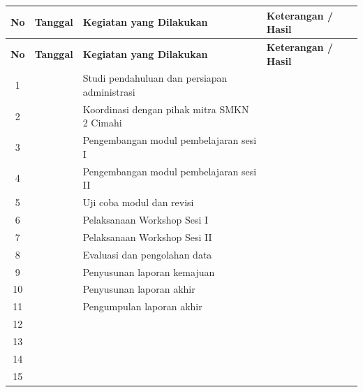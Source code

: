 
\begin{longtable}{|c|p{2.5cm}|p{7cm}|p{3cm}|}
    \hline
    \textbf{No} & \textbf{Tanggal} & \textbf{Kegiatan yang Dilakukan} & \textbf{Keterangan / Hasil} \\ \hline
    \endfirsthead

    \hline
    \textbf{No} & \textbf{Tanggal} & \textbf{Kegiatan yang Dilakukan} & \textbf{Keterangan / Hasil} \\ \hline
    \endhead

    1 & & Studi pendahuluan dan persiapan administrasi & \\ \hline
    2 & & Koordinasi dengan pihak mitra SMKN 2 Cimahi & \\ \hline
    3 & & Pengembangan modul pembelajaran sesi I & \\ \hline
    4 & & Pengembangan modul pembelajaran sesi II & \\ \hline
    5 & & Uji coba modul dan revisi & \\ \hline
    6 & & Pelaksanaan Workshop Sesi I & \\ \hline
    7 & & Pelaksanaan Workshop Sesi II & \\ \hline
    8 & & Evaluasi dan pengolahan data & \\ \hline
    9 & & Penyusunan laporan kemajuan & \\ \hline
    10 & & Penyusunan laporan akhir & \\ \hline
    11 & & Pengumpulan laporan akhir & \\ \hline
    12 & & & \\ \hline
    13 & & & \\ \hline
    14 & & & \\ \hline
    15 & & & \\ \hline
\end{longtable}
